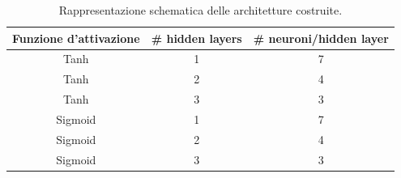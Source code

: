 \documentclass[12pt,a4paper,final]{book}
\begin{document}
\begin{table}[!ht]
	\centering
	\begin{tabular}{||c | c | c||}
	\hline
	Funzione d'attivazione & \# hidden layers & \# neuroni/hidden layer \\
	\hline\hline
	Tanh & 1 & 7 \\
	\hline
	Tanh & 2 & 4 \\
	\hline
	Tanh & 3 & 3 \\
	\hline
	Sigmoid & 1 & 7 \\
	\hline
	Sigmoid & 2 & 4 \\
	\hline
	Sigmoid & 3 & 3 \\
	\hline
	\end{tabular}
	\caption{Rappresentazione schematica delle architetture costruite.}
	\label{architetture}
\end{table}
\end{document}
